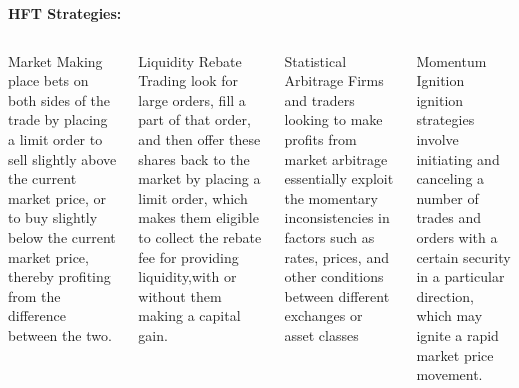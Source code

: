 \documentclass[xcolor={x11names,svgnames,dvipsnames}]{beamer}
\begin{document}
\begin{frame}

\textbf{\large{HFT Strategies:}}

\begin{columns}
\column{2.4in}
\begin{block}{Market Making}
\small{place bets on both sides of the trade by placing a limit order to
sell slightly above the current market price, or to buy slightly below the current
market price, thereby profiting from the difference between the two. }
\end{block}
\begin{block}{Liquidity Rebate Trading
 }
\small{look for large orders, fill a
part of that order, and then offer these shares back to the market by placing a limit order, which makes them eligible to collect the rebate fee for providing liquidity,with or without them making a capital gain.}
\end{block}
\column{2.5in}
\begin{block}{\alert{Statistical Arbitrage}}
\small{Firms and traders looking to make profits from market arbitrage essentially exploit
 the momentary inconsistencies in factors such as rates, prices, and other conditions
 between different exchanges or asset classes}
\end{block}
\begin{block}{Momentum Ignition }
\small{ ignition strategies involve initiating and canceling a number of trades and orders with a certain security in a particular direction, which may ignite a rapid market price movement.}
\end{block}
\end{columns}
\end{frame}
\end{document}
